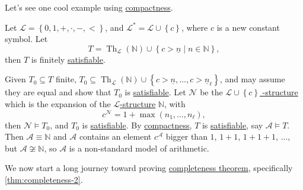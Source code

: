 Let's see one cool example using \hyperref[thm:compactness]{compactness}.

\begin{eg}
	Let \(\mathcal{L} = \left\{ 0, 1, +, \cdot, -, < \right\} \), and \(\mathcal{L} ^{\ast} = \mathcal{L} \cup \left\{ c \right\} \), where \(c\) is a new constant symbol. Let
	\[
		T = \mathop{\mathrm{Th}}\nolimits_{\mathcal{L} }(\mathbb{N} ) \cup \left\{ c > \underline{n} \mid n \in \mathbb{N}  \right\} ,
	\]
	then \(T\) is finitely \hyperref[def:satisfiable]{satisfiable}.
\end{eg}
\begin{explanation}
	Given \(T_0 \subseteq T\) finite, \(T_0 \subseteq \mathop{\mathrm{Th}}\nolimits_{\mathcal{L} }(\mathbb{N} ) \cup \left\{ c> \underline{n}, \ldots , c>\underline{n}_{\ell }  \right\} \), and may assume they are equal and show that \(T_0\) is \hyperref[def:satisfiable]{satisfiable}. Let \(\mathcal{N} \) be the \hyperref[def:structure]{\(\mathcal{L} \cup \left\{ c \right\} \) -structure} which is the expansion of the \hyperref[def:structure]{\(\mathcal{L} \)-structure} \(\mathbb{N} \), with
	\[
		c^{\mathcal{N} }  = 1 + \max (n_1, \ldots , n_{\ell } ),
	\]
	then \(\mathcal{N} \models T_0\), and \(T_0\) is \hyperref[def:satisfiable]{satisfiable}. By \hyperref[thm:compactness]{compactness}, \(T\) is \hyperref[def:satisfiable]{satisfiable}, say \(\mathcal{A} \models T\). Then \(\mathcal{A} \equiv \mathbb{N} \) and \(\mathcal{A} \) contains an element \(c^{\mathcal{A} } \) bigger than \(1\), \(1+1\), \(1+1+1\), ..., but \(\mathcal{A} \not \cong \mathbb{N} \), so \(\mathcal{A} \) is a non-standard model of arithmetic.
\end{explanation}

We now start a long journey toward proving \hyperref[thm:completeness]{completeness theorem}, specifically \autoref{thm:completeness-2}.